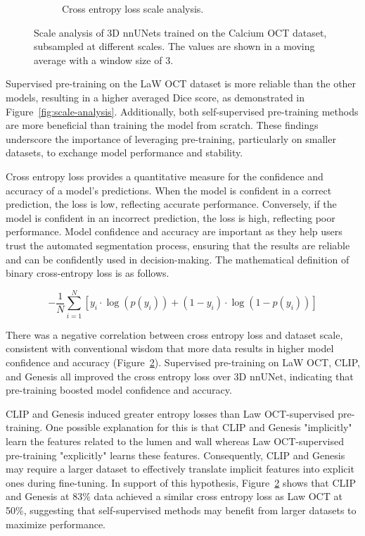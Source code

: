 \documentclass[a4paper,11pt,oneside]{report}
\begin{document}
\begin{figure}[hbt]
\begin{subfigure}[t]{0.49\textwidth}
        \caption{Cross entropy loss scale analysis.}
        \label{fig:cross-entropy-scale-analysis}
    \end{subfigure}
    \caption{Scale analysis of 3D nnUNets trained on the Calcium OCT dataset, subsampled at different scales. The values are shown in a moving average with a window size of 3.}
\end{figure}

Supervised pre-training on the LaW OCT dataset is more reliable than the other models, resulting in a higher averaged Dice score, as demonstrated in Figure~\ref{fig:scale-analysis}. Additionally, both self-supervised pre-training methods are more beneficial than training the model from scratch. These findings underscore the importance of leveraging pre-training, particularly on smaller datasets, to exchange model performance and stability.

Cross entropy loss provides a quantitative measure for the confidence and accuracy of a model's predictions. When the model is confident in a correct prediction, the loss is low, reflecting accurate performance. Conversely, if the model is confident in an incorrect prediction, the loss is high, reflecting poor performance. Model confidence and accuracy are important as they help users trust the automated segmentation process, ensuring that the results are reliable and can be confidently used in decision-making. The mathematical definition of binary cross-entropy loss is as follows.

\begin{equation}
-\frac{1}{N}\sum_{i=1}^{N}\left[y_{i}\cdot\log\left(p(y_{i})\right)+ \left( 1-y_{i} \right)\cdot \log\left(1 - p(y_{i})\right) \right]
\end{equation}

There was a negative correlation between cross entropy loss and dataset scale, consistent with conventional wisdom that more data results in higher model confidence and accuracy (Figure~\ref{fig:cross-entropy-scale-analysis}). Supervised pre-training on LaW OCT, CLIP, and Genesis all improved the cross entropy loss over 3D nnUNet, indicating that pre-training boosted model confidence and accuracy. 

CLIP and Genesis induced greater entropy losses than Law OCT-supervised pre-training. One possible explanation for this is that CLIP and Genesis "implicitly" learn the features related to the lumen and wall whereas Law OCT-supervised pre-training "explicitly" learns these features. Consequently, CLIP and Genesis may require a larger dataset to effectively translate implicit features into explicit ones during fine-tuning. In support of this hypothesis, Figure~\ref{fig:cross-entropy-scale-analysis} shows that CLIP and Genesis at 83\% data achieved a similar cross entropy loss as Law OCT at 50\%, suggesting that self-supervised methods may benefit from larger datasets to maximize performance. 
\end{document}
